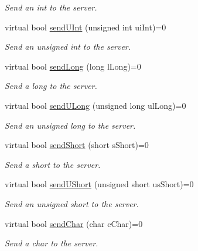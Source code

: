 \begin{DoxyCompactItemize}
\begin{DoxyCompactList}\small\item\em Send an int to the server. \end{DoxyCompactList}\item 
virtual bool \hyperlink{class_rad_j_a_v_1_1_networking_1_1_tcpip_client_a2ec37c58d5b4bc9f5460d972a692c52a}{send\+U\+Int} (unsigned int ui\+Int)=0
\begin{DoxyCompactList}\small\item\em Send an unsigned int to the server. \end{DoxyCompactList}\item 
virtual bool \hyperlink{class_rad_j_a_v_1_1_networking_1_1_tcpip_client_aceb6808d0f664dca25ebd56ca1d487ed}{send\+Long} (long l\+Long)=0
\begin{DoxyCompactList}\small\item\em Send a long to the server. \end{DoxyCompactList}\item 
virtual bool \hyperlink{class_rad_j_a_v_1_1_networking_1_1_tcpip_client_a0d74f790e410fbecba34e53d4d47ad9f}{send\+U\+Long} (unsigned long ul\+Long)=0
\begin{DoxyCompactList}\small\item\em Send an unsigned long to the server. \end{DoxyCompactList}\item 
virtual bool \hyperlink{class_rad_j_a_v_1_1_networking_1_1_tcpip_client_ab9d07bcc1dc53c68a1f65bce0fdf613b}{send\+Short} (short s\+Short)=0
\begin{DoxyCompactList}\small\item\em Send a short to the server. \end{DoxyCompactList}\item 
virtual bool \hyperlink{class_rad_j_a_v_1_1_networking_1_1_tcpip_client_a47f22ef4c7e7a8b5a938b8f567eee0ee}{send\+U\+Short} (unsigned short us\+Short)=0
\begin{DoxyCompactList}\small\item\em Send an unsigned short to the server. \end{DoxyCompactList}\item 
virtual bool \hyperlink{class_rad_j_a_v_1_1_networking_1_1_tcpip_client_a03068a5be5c7a1482aacf0c706ad3d9d}{send\+Char} (char c\+Char)=0
\begin{DoxyCompactList}\small\item\em Send a char to the server. \end{DoxyCompactList}\item 

\end{DoxyCompactItemize}
